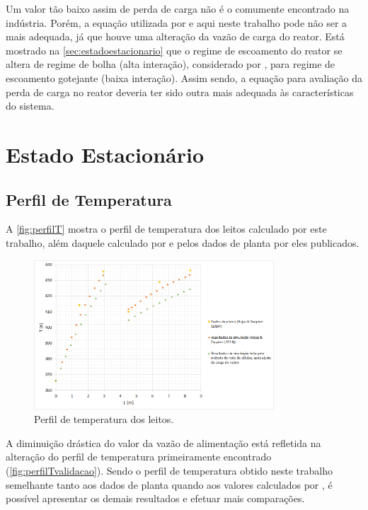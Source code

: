 Um valor tão baixo assim de perda de carga não é o comumente encontrado na
indústria. Porém, a equação utilizada por  e aqui neste
trabalho pode não ser a mais adequada, já que houve uma alteração da vazão de
carga do reator. Está mostrado na \autoref{sec:estadoestacionario} que o regime
de escoamento do reator se altera de regime de bolha (alta interação),
considerado por , para regime de escoamento gotejante
(baixa interação). Assim sendo, a equação para avaliação da perda de carga no
reator deveria ter sido outra mais adequada às características do sistema.

\section{Estado Estacionário} \label{sec:estadoestacionario}

\subsection{Perfil de Temperatura} \label{sec:perfildetemperatura}

A \autoref{fig:perfilT} mostra o perfil de temperatura dos leitos
calculado por este trabalho, além daquele calculado por 
e pelos dados de planta por eles publicados.  

\begin{figure}[htb]
\centering \includegraphics[width=0.8\textwidth]{images/Chap4/perfilT.png}
\caption{Perfil de temperatura dos leitos.}
\label{fig:perfilT}
\end{figure}

A diminuição drástica do valor da vazão de alimentação está refletida na alteração
do perfil de temperatura primeiramente encontrado
(\autoref{fig:perfilTvalidacao}). Sendo o perfil de temperatura obtido neste
trabalho semelhante tanto aos dados de planta quando aos valores calculados por
, é possível apresentar os demais resultados e efetuar
mais comparações.


